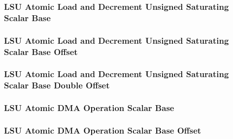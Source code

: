 

\subsubsection[{\small LSU Atomic Load and Decrement Unsigned Saturating Scalar Base}]{LSU Atomic Load and Decrement Unsigned Saturating Scalar Base} \label{sec:format-LSU-ALDUSSB}



\subsubsection[{\small LSU Atomic Load and Decrement Unsigned Saturating Scalar Base Offset}]{LSU Atomic Load and Decrement Unsigned Saturating Scalar Base Offset} \label{sec:format-LSU-ALDUSSB.O}



\subsubsection[{\small LSU Atomic Load and Decrement Unsigned Saturating Scalar Base Double Offset}]{LSU Atomic Load and Decrement Unsigned Saturating Scalar Base Double Offset} \label{sec:format-LSU-ALDUSSB.D}



\subsubsection[{\small LSU Atomic DMA Operation Scalar Base}]{LSU Atomic DMA Operation Scalar Base} \label{sec:format-LSU-ADMAQSB}



\subsubsection[{\small LSU Atomic DMA Operation Scalar Base Offset}]{LSU Atomic DMA Operation Scalar Base Offset} \label{sec:format-LSU-ADMAQSB.O}


